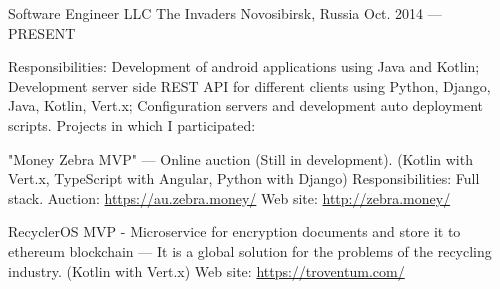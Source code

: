 


\begin{cventries}


\cventry
{Software Engineer} %
{LLC The Invaders} %
{Novosibirsk, Russia} %
{Oct. 2014 --- PRESENT} %
{
Responsibilities: Development of android applications using Java and Kotlin; Development server side REST API for different clients using Python, Django, Java, Kotlin, Vert.x; Configuration servers and development auto deployment scripts.\linebreak
\linebreak
Projects in which I participated:\linebreak
\linebreak
\begin{cvitems}
    \item {
        \begin{flushleft}
            "Money Zebra MVP" --- Online auction (Still in development). (Kotlin with Vert.x, TypeScript with Angular, Python with Django)\linebreak
            Responsibilities: Full stack.\linebreak
            Auction: \url{https://au.zebra.money/}\linebreak
            Web site: \url{http://zebra.money/}\linebreak
        \end{flushleft}
    }
    \item {
        \begin{flushleft}
            RecyclerOS MVP - Microservice for encryption documents and store it to ethereum blockchain — It is a global solution for the problems of the recycling industry. (Kotlin with Vert.x)\linebreak
            Web site: \url{https://troventum.com/}\linebreak
        \end{flushleft}
}
\end{cvitems}}
\end{cventries}
